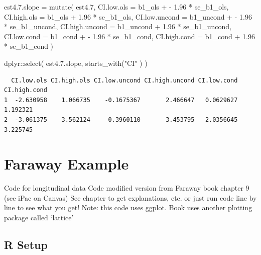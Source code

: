 \documentclass[
  letterpaper,
  DIV=11,
  numbers=noendperiod]{scrreprt}
\newenvironment{Shaded}{\begin{snugshade}}{\end{snugshade}}
\newcommand{\AttributeTok}[1]{\textcolor[rgb]{0.49,0.56,0.16}{#1}}
\newcommand{\FloatTok}[1]{\textcolor[rgb]{0.25,0.63,0.44}{#1}}
\newcommand{\FunctionTok}[1]{\textcolor[rgb]{0.02,0.16,0.49}{#1}}
\newcommand{\NormalTok}[1]{\textcolor[rgb]{0.00,0.44,0.13}{#1}}
\newcommand{\OtherTok}[1]{\textcolor[rgb]{0.00,0.44,0.13}{#1}}
\newcommand{\SpecialCharTok}[1]{\textcolor[rgb]{0.25,0.44,0.63}{#1}}
\newcommand{\StringTok}[1]{\textcolor[rgb]{0.25,0.44,0.63}{#1}}
\begin{document}
\begin{Shaded}
\begin{Highlighting}[]
\NormalTok{est4.}\FloatTok{7.}\NormalTok{slope }\OtherTok{=} \FunctionTok{mutate}\NormalTok{( est4}\FloatTok{.7}\NormalTok{, }
                     \AttributeTok{CI.low.ols =}\NormalTok{ b1\_ols }\SpecialCharTok{+} \SpecialCharTok{{-}} \FloatTok{1.96} \SpecialCharTok{*}\NormalTok{ se\_b1\_ols,}
                     \AttributeTok{CI.high.ols =}\NormalTok{ b1\_ols }\SpecialCharTok{+} \FloatTok{1.96} \SpecialCharTok{*}\NormalTok{ se\_b1\_ols,}
                     \AttributeTok{CI.low.uncond =}\NormalTok{ b1\_uncond }\SpecialCharTok{+} \SpecialCharTok{{-}} \FloatTok{1.96} \SpecialCharTok{*}\NormalTok{ se\_b1\_uncond,}
                     \AttributeTok{CI.high.uncond =}\NormalTok{ b1\_uncond }\SpecialCharTok{+} \FloatTok{1.96} \SpecialCharTok{*}\NormalTok{ se\_b1\_uncond,}
                     \AttributeTok{CI.low.cond =}\NormalTok{ b1\_cond }\SpecialCharTok{+} \SpecialCharTok{{-}} \FloatTok{1.96} \SpecialCharTok{*}\NormalTok{ se\_b1\_cond,}
                     \AttributeTok{CI.high.cond =}\NormalTok{ b1\_cond }\SpecialCharTok{+} \FloatTok{1.96} \SpecialCharTok{*}\NormalTok{ se\_b1\_cond )}

\NormalTok{dplyr}\SpecialCharTok{::}\FunctionTok{select}\NormalTok{( est4.}\FloatTok{7.}\NormalTok{slope, }\FunctionTok{starts\_with}\NormalTok{(}\StringTok{"CI"}\NormalTok{ ) )}
\end{Highlighting}
\end{Shaded}

\begin{verbatim}
  CI.low.ols CI.high.ols CI.low.uncond CI.high.uncond CI.low.cond CI.high.cond
1  -2.630958    1.066735    -0.1675367       2.466647   0.0629627     1.192321
2  -3.061375    3.562124     0.3960110       3.453795   2.0356645     3.225745
\end{verbatim}

\hypertarget{faraway-example}{%
\chapter{Faraway Example}\label{faraway-example}}

Code for longitudinal data Code modified version from Faraway book
chapter 9 (see iPac on Canvas) See chapter to get explanations, etc. or
just run code line by line to see what you get! Note: this code uses
ggplot. Book uses another plotting package called `lattice'

\hypertarget{r-setup-3}{%
\section{R Setup}\label{r-setup-3}}
\end{document}
